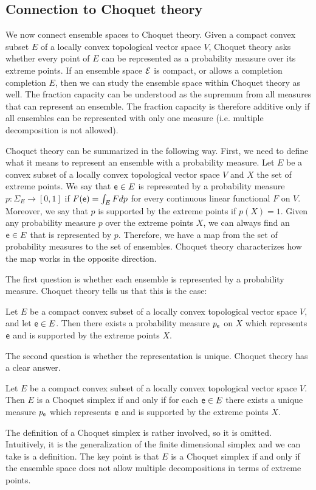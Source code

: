 \subsection{Connection to Choquet theory}

We now connect ensemble spaces to Choquet theory. Given a compact convex subset $E$ of a locally convex topological vector space $V$, Choquet theory asks whether every point of $E$ can be represented as a probability measure over its extreme points. If an ensemble space $\mathcal{E}$ is compact, or allows a completion completion $E$, then we can study the ensemble space within Choquet theory as well. The fraction capacity can be understood as the supremum from all measures that can represent an ensemble. The fraction capacity is therefore additive only if all ensembles can be represented with only one measure (i.e. multiple decomposition is not allowed).

Choquet theory can be summarized in the following way. First, we need to define what it means to represent an ensemble with a probability measure. Let $E$ be a convex subset of a locally convex topological vector space $V$ and $X$ the set of extreme points. We say that $\mathsf{e} \in E$ is represented by a probability measure $p : \Sigma_{E} \to [0,1]$ if $F(\mathsf{e}) = \int_E F dp$ for every continuous linear functional $F$ on $V$. Moreover, we say that $p$ is supported by the extreme points if $p(X) = 1$. Given any probability measure $p$ over the extreme points $X$, we can always find an $\mathsf{e} \in E$ that is represented by $p$. Therefore, we have a map from the set of probability measures to the set of ensembles. Choquet theory characterizes how the map works in the opposite direction.

The first question is whether each ensemble is represented by a probability measure. Choquet theory tells us that this is the case:
\begin{thrm}
	Let $E$ be a compact convex subset of a locally convex topological vector space $V$, and let $\mathsf{e} \in E$. Then there exists a probability measure $p_{\mathsf{e}}$ on $X$ which represents $\mathsf{e}$ and is supported by the extreme points $X$.
\end{thrm}
The second question is whether the representation is unique. Choquet theory has a clear answer.
\begin{thrm}
	Let $E$ be a compact convex subset of a locally convex topological vector space $V$. Then $E$ is a Choquet simplex if and only if for each $\mathsf{e} \in E$ there exists a unique measure $p_{\mathsf{e}}$ which represents $\mathsf{e}$ and is supported by the extreme points $X$.
\end{thrm}
The definition of a Choquet simplex is rather involved, so it is omitted. Intuitively, it is the generalization of the finite dimensional simplex and we can take is a definition. The key point is that $E$ is a Choquet simplex if and only if the ensemble space does not allow multiple decompositions in terms of extreme points.

